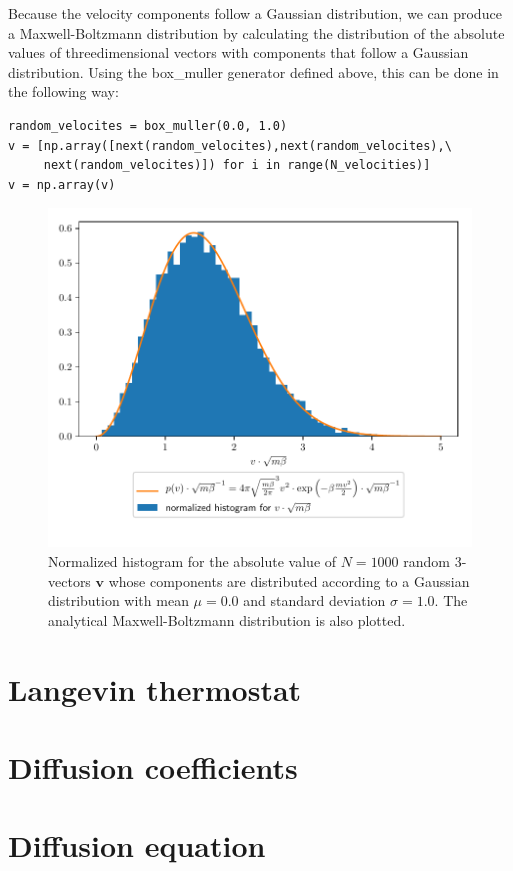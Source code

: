 \documentclass[a4paper,10pt,bibtotoc]{scrartcl}
\begin{document}
Because the velocity components follow a Gaussian distribution, we can produce a Maxwell-Boltzmann distribution by calculating the distribution of the absolute values of threedimensional vectors with components that follow a Gaussian distribution.
Using the box\_muller generator defined above, this can be done in the following way:
\begin{lstlisting}
random_velocites = box_muller(0.0, 1.0)
v = [np.array([next(random_velocites),next(random_velocites),\
     next(random_velocites)]) for i in range(N_velocities)] 
v = np.array(v)
\end{lstlisting}

\begin{figure}[H]
	\centering
	\includegraphics[width=\linewidth]{maxwell_boltzmann.pdf}
	\caption{Normalized histogram for the absolute value of $N=1000$ random 3-vectors $\mathbf{v}$ whose components are distributed according to a Gaussian distribution with mean $\mu=0.0$ and standard deviation $\sigma = 1.0$. The analytical Maxwell-Boltzmann distribution is also plotted.}
	\label{fig:fig4}
\end{figure}

\section{Langevin thermostat}
\section{Diffusion coefficients}
\section{Diffusion equation}
      
\end{document}
